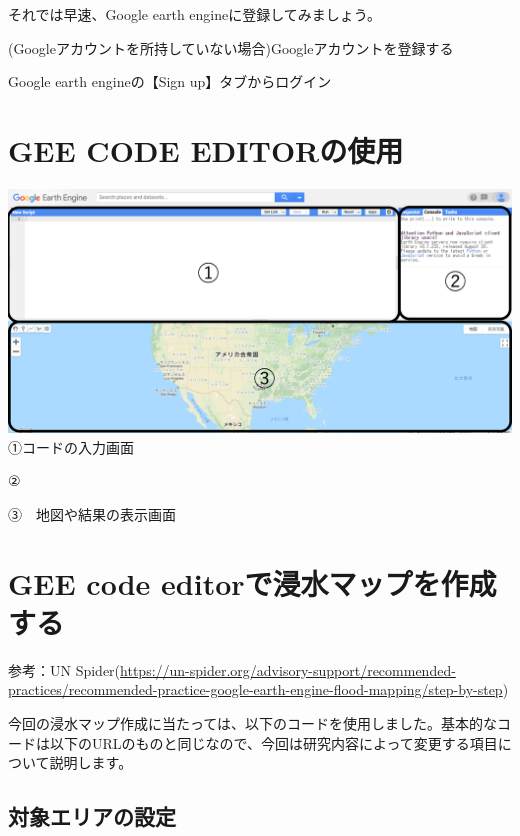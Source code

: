 \documentclass[
]{book}
\begin{document}
それでは早速、Google earth engineに登録してみましょう。　　

(Googleアカウントを所持していない場合)Googleアカウントを登録する　　

Google earth engineの【Sign up】タブからログイン　

\hypertarget{gee-code-editorux306eux4f7fux7528}{%
\section{GEE CODE EDITORの使用　　}\label{gee-code-editorux306eux4f7fux7528}}

\includegraphics{images/GEE.png}
①コードの入力画面　　

②　　

③　地図や結果の表示画面　　

\hypertarget{gee-code-editorux3067ux6d78ux6c34ux30deux30c3ux30d7ux3092ux4f5cux6210ux3059ux308b}{%
\section{GEE code editorで浸水マップを作成する　　}\label{gee-code-editorux3067ux6d78ux6c34ux30deux30c3ux30d7ux3092ux4f5cux6210ux3059ux308b}}

参考：UN Spider(\url{https://un-spider.org/advisory-support/recommended-practices/recommended-practice-google-earth-engine-flood-mapping/step-by-step})

今回の浸水マップ作成に当たっては、以下のコードを使用しました。基本的なコードは以下のURLのものと同じなので、今回は研究内容によって変更する項目について説明します。

\hypertarget{ux5bfeux8c61ux30a8ux30eaux30a2ux306eux8a2dux5b9a}{%
\subsection{対象エリアの設定}\label{ux5bfeux8c61ux30a8ux30eaux30a2ux306eux8a2dux5b9a}}
\end{document}
